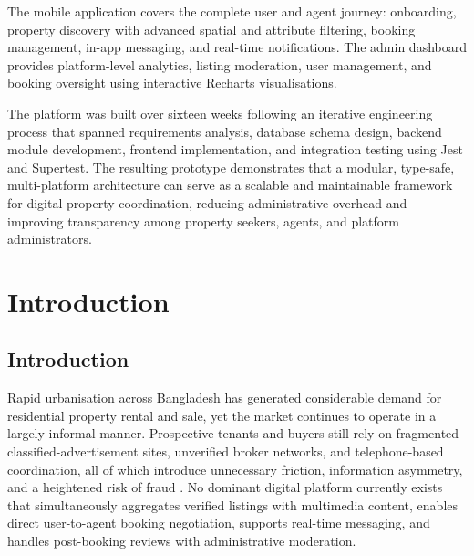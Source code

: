 \documentclass[12pt,a4paper]{report}
\begin{document}
The mobile application covers the complete user and agent journey: onboarding, property
discovery with advanced spatial and attribute filtering, booking management, in-app
messaging, and real-time notifications. The admin dashboard provides platform-level
analytics, listing moderation, user management, and booking oversight using interactive
Recharts visualisations.

The platform was built over sixteen weeks following an iterative engineering process
that spanned requirements analysis, database schema design, backend module development,
frontend implementation, and integration testing using Jest and Supertest. The resulting
prototype demonstrates that a modular, type-safe, multi-platform architecture can serve as
a scalable and maintainable framework for digital property coordination, reducing
administrative overhead and improving transparency among property seekers, agents, and
platform administrators.

\clearpage

\tableofcontents
\clearpage

\listoftables
\clearpage

\listoffigures
\clearpage

\setcounter{page}{1}

\chapter{Introduction}

\section{Introduction}

Rapid urbanisation across Bangladesh has generated considerable demand for residential
property rental and sale, yet the market continues to operate in a largely informal manner.
Prospective tenants and buyers still rely on fragmented classified-advertisement sites,
unverified broker networks, and telephone-based coordination, all of which introduce
unnecessary friction, information asymmetry, and a heightened risk of fraud
\cite{hossain2019}. No dominant digital platform currently exists that simultaneously
aggregates verified listings with multimedia content, enables direct user-to-agent booking
negotiation, supports real-time messaging, and handles post-booking reviews with
administrative moderation.
\end{document}
